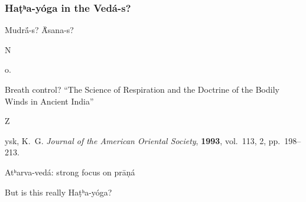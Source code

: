 \documentclass[pdf]{beamer}
\newcommand{\Subitem}[1]{{\setlength\itemindent{12pt} \item[-] #1}}
\begin{document}
\begin{frame} \frametitle{Haṭʰa-yóga in the Vedá-s?}
\begin{itemize}
	\item Mudrā́-s? Ā́sana-s?
	\Subitem No.
	\item Breath control? ``The Science of Respiration and the Doctrine of the Bodily Winds in Ancient India''
	\Subitem Zysk, K.~G. \emph{Journal of the American Oriental Society}, \textbf{1993}, vol.~113, 2, pp.~198--213.
	\item Atʰarva-vedá: strong focus on prāṇá
	\item But is this really Haṭʰa-yóga?
\end{itemize}
\end{frame}

\end{document}
